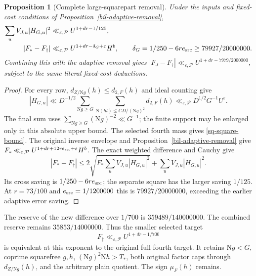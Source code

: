 \documentclass[11pt]{article}
\newtheorem{proposition}[theorem]{Proposition}
\theoremstyle{definition}
\newcommand{\N}{\mathrm N}
\newcommand{\eps}{\varepsilon}
\newcommand{\lls}{\ll_{\eps,\mathcal P}}
\begin{document}
\begin{proposition}[Complete large-squarepart removal]
\label{sq-removal-proposition}
Under the inputs and fixed-cost conditions of
Proposition~\ref{bil-adaptive-removal},
\begin{align}
 \sum_uV_{J,u}|H_{G,u}|^2&\lls U^{1+dr-1/125},
                                      \label{sq-square-bound}\\
 |F_*-F_\dagger|&\ll_{\eps,\mathcal P}
        U^{1+dr-\delta_G+\eps}H^b,
 \qquad \delta_G=1/250-6re_{\rm src}
                         \ge79927/20000000.\label{sq-full-removal}
\end{align}
Combining this with the adaptive removal gives
$|F_J-F_\dagger|\lls U^{1+dr-7979/2000000}$, subject to the same
literal fixed-cost deductions.
\end{proposition}
\begin{proof}
For every row, $d_{Z/\N g}(h)\le d_{2,F}(h)$ and ideal counting give
\[
 |H_{G,u}|\ll D^{-1/2}\sum_{\N g\ge G}
       \sum_{\N(hl)\le CD/(\N g)^2}d_{2,F}(h)
 \ll_{\eps,\mathcal P} D^{1/2}G^{-1}U^\eps.
\]
The final sum uses $\sum_{\N g\ge G}(\N g)^{-2}\ll G^{-1}$;
the finite support may be enlarged only in this absolute upper bound.
The selected fourth mass gives \eqref{sq-square-bound}.
The original inverse envelope and Proposition~\ref{bil-adaptive-removal}
give $F_*\ll_{\eps,\mathcal P}U^{1+dr+12re_{\rm src}+\eps}H^b$.
The exact weighted difference and Cauchy give
\[
 |F_*-F_\dagger|\le
 2\sqrt{F_*\sum_uV_{J,u}|H_{G,u}|^2}
       +\sum_uV_{J,u}|H_{G,u}|^2.
\]
Its cross saving is $1/250-6re_{\rm src}$; the separate square
has the larger saving $1/125$.
At $r=73/100$ and $e_{\rm src}=1/1200000$ this is
$79927/20000000$, exceeding the earlier adaptive error saving.
\end{proof}
The reserve of the new difference over $1/700$ is
$359489/140000000$. The combined reserve remains $35853/14000000$.
Thus the smaller selected target
\begin{equation}\label{sq-residual-target}
 F_\dagger\lls U^{1+dr-1/700}
\end{equation}
is equivalent at this exponent to the original full fourth target.
It retains $\N g<G$, coprime squarefree $g,h$, $(\N g)^2\N h>T_*$,
both original factor caps through $d_{Z/\N g}(h)$, and the arbitrary
plain quotient. The sign $\mu_F(h)$ remains.
\end{document}
